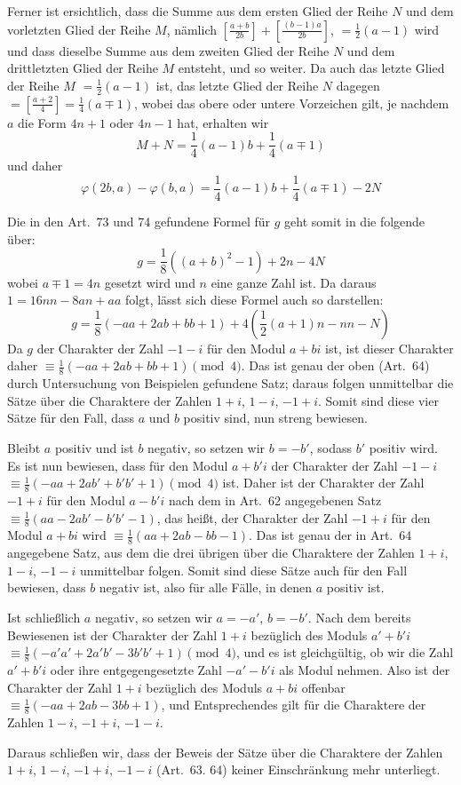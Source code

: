 Ferner ist ersichtlich, dass die Summe aus dem ersten Glied der Reihe $N$ und dem vorletzten Glied der Reihe $M$, nämlich $\left[\frac{a+b}{2b}\right]+\left[\frac{(b-1)a}{2b}\right]$, $=\frac12(a-1)$ wird und dass dieselbe Summe aus dem zweiten Glied der Reihe $N$ und dem drittletzten Glied der Reihe $M$ entsteht, und so weiter. Da auch das letzte Glied der Reihe $M$ $=\frac12(a-1)$ ist, das letzte Glied der Reihe $N$ dagegen $=\left[\frac{a+2}{4}\right]=\frac14(a\mp1)$, wobei das obere oder untere Vorzeichen gilt, je nachdem $a$ die Form $4n+1$ oder $4n-1$ hat, erhalten wir
\[
M+N=\frac14(a-1)b+\frac14(a\mp1)
\]
und daher
\[
\varphi(2b,a)-\varphi(b,a)=\frac14(a-1)b+\frac14(a\mp1)-2N
\]

%
Die in den Art.~73 und 74 gefundene Formel für $g$ geht somit in die folgende über:
\[
g=\frac18((a+b)^2-1)+2n-4N
\]
wobei $a\mp1=4n$ gesetzt wird und $n$ eine ganze Zahl ist. Da daraus $1=16nn-8an+aa$ folgt, lässt sich diese Formel auch so darstellen:
\[
g=\frac18(-aa+2ab+bb+1)+4(\frac12(a+1)n-nn-N)
\]
Da $g$ der Charakter der Zahl $-1-i$ für den Modul $a+bi$ ist, ist dieser Charakter daher $\equiv\frac18(-aa+2ab+bb+1)\pmod4$. Das ist genau der oben (Art.~64) durch Untersuchung von Beispielen gefundene Satz; daraus folgen unmittelbar die Sätze über die Charaktere der Zahlen $1+i$, $1-i$, $-1+i$. Somit sind diese vier Sätze für den Fall, dass $a$ und $b$ positiv sind, nun streng bewiesen.

Bleibt $a$ positiv und ist $b$ negativ, so setzen wir $b=-b'$, sodass $b'$ positiv wird. Es ist nun bewiesen, dass für den Modul $a+b'i$ der Charakter der Zahl $-1-i$ $\equiv\frac18(-aa+2ab'+b'b'+1)\pmod4$ ist. Daher ist der Charakter der Zahl $-1+i$ für den Modul $a-b'i$ nach dem in Art.~62 angegebenen Satz $\equiv\frac18(aa-2ab'-b'b'-1)$, das heißt, der Charakter der Zahl $-1+i$ für den Modul $a+bi$ wird $\equiv\frac18(aa+2ab-bb-1)$. Das ist genau der in Art.~64 angegebene Satz, aus dem die drei übrigen über die Charaktere der Zahlen $1+i$, $1-i$, $-1-i$ unmittelbar folgen. Somit sind diese Sätze auch für den Fall bewiesen, dass $b$ negativ ist, also für alle Fälle, in denen $a$ positiv ist.

Ist schließlich $a$ negativ, so setzen wir $a=-a'$, $b=-b'$. Nach dem bereits Bewiesenen ist der Charakter der Zahl $1+i$ bezüglich des Moduls $a'+b'i$ $\equiv\frac18(-a'a'+2a'b'-3b'b'+1)\pmod4$, und es ist gleichgültig, ob wir die Zahl $a'+b'i$ oder ihre entgegengesetzte Zahl $-a'-b'i$ als Modul nehmen. Also ist der Charakter der Zahl $1+i$ bezüglich des Moduls $a+bi$ offenbar $\equiv\frac18(-aa+2ab-3bb+1)$, und Entsprechendes gilt für die Charaktere der Zahlen $1-i$, $-1+i$, $-1-i$.

Daraus schließen wir, dass der Beweis der Sätze über die Charaktere der Zahlen $1+i$, $1-i$, $-1+i$, $-1-i$ (Art.~63. 64) keiner Einschränkung mehr unterliegt.
